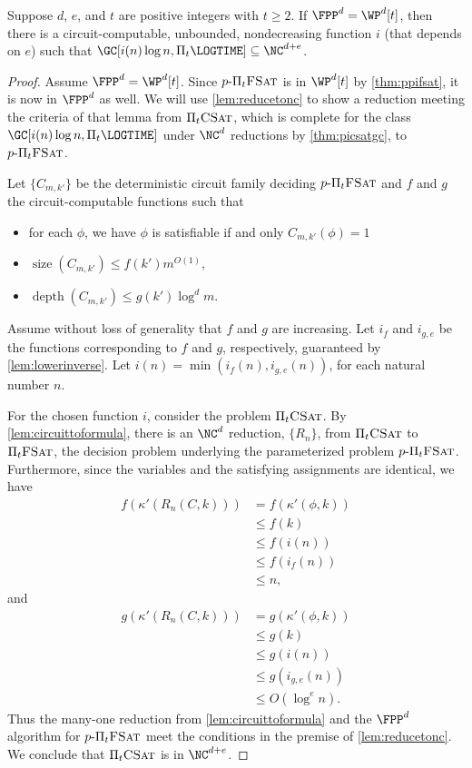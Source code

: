 \documentclass{article}
\newcommand{\dash}{\textnormal{-}}
\newcommand{\pPiFSAT}{p \dash \Pi_t \textsc{FSat}}
\newcommand{\PiFSAT}{\Pi_t \textsc{FSat}}
\newcommand{\PiCSAT}{\Pi_t \textsc{CSat}}
\DeclareMathOperator{\depth}{depth}
\DeclareMathOperator{\size}{size}
\begin{document}
\begin{theorem}
  Suppose $d$, $e$, and $t$ are positive integers with $t \geq 2$.
  If $\FPP^d = \WP^d[t]$, then there is a circuit-computable, unbounded, nondecreasing function $i$ (that depends on $e$) such that %
  $\GC[i(n) \log n, \Pi_t \LOGTIME] \subseteq \NC^{d + e}$.
\end{theorem}
\begin{proof}
  Assume $\FPP^d = \WP^d[t]$.
  Since $\pPiFSAT$ is in $\WP^d[t]$ by \autoref{thm:ppifsat}, it is now in $\FPP^d$ as well.
  We will use \autoref{lem:reducetonc} to show a reduction meeting the criteria of that lemma from $\PiCSAT$, which is complete for the class $\GC[i(n) \log n, \Pi_t \LOGTIME]$ under $\NC^d$ reductions by \autoref{thm:picsatgc}, to $\pPiFSAT$.

  Let $\{C_{m, k'}\}$ be the deterministic circuit family deciding $\pPiFSAT$ and $f$ and $g$ the circuit-computable functions such that
  \begin{itemize}
  \item for each $\phi$, we have $\phi$ is satisfiable if and only $C_{m, k'}(\phi) = 1$
  \item $\size(C_{m, k'}) \leq f(k') m^{O(1)}$,
  \item $\depth(C_{m, k'}) \leq g(k') \log^d m$.
  \end{itemize}
  Assume without loss of generality that $f$ and $g$ are increasing.
  Let $i_f$ and $i_{g, e}$ be the functions corresponding to $f$ and $g$, respectively, guaranteed by \autoref{lem:lowerinverse}.
  Let $i(n) = \min(i_f(n), i_{g, e}(n))$, for each natural number $n$.

  For the chosen function $i$, consider the problem $\PiCSAT$.
  By \autoref{lem:circuittoformula}, there is an $\NC^d$ reduction, $\{R_n\}$, from $\PiCSAT$ to $\PiFSAT$, the decision problem underlying the parameterized problem $\pPiFSAT$.
  Furthermore, since the variables and the satisfying assignments are identical, we have
  \begin{align*}
    f(\kappa'(R_n(C, k))) & = f(\kappa'(\phi, k)) \\
    & \leq f(k) \\
    & \leq f(i(n)) \\
    & \leq f(i_f(n)) \\
    & \leq n,
  \end{align*}
  and
  \begin{align*}
    g(\kappa'(R_n(C, k))) & = g(\kappa'(\phi, k)) \\
    & \leq g(k) \\
    & \leq g(i(n)) \\
    & \leq g(i_{g, e}(n)) \\
    & \leq O(\log^e n).
  \end{align*}
  Thus the many-one reduction from \autoref{lem:circuittoformula} and the $\FPP^d$ algorithm for $\pPiFSAT$ meet the conditions in the premise of \autoref{lem:reducetonc}.
  We conclude that $\PiCSAT$ is in $\NC^{d + e}$.
\end{proof}
\end{document}
